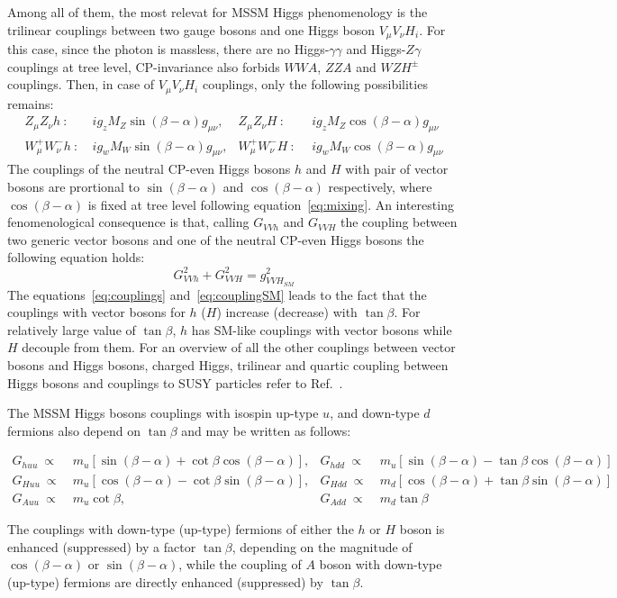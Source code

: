 Among all of them, the most relevat for MSSM Higgs phenomenology is the trilinear couplings between two gauge bosons and one Higgs boson $V_{\mu}V_{\nu}H_i$.
For this case, since the photon is massless, there are no Higgs-$\gamma\gamma$ and Higgs-$Z\gamma$ couplings at tree level, CP-invariance also forbids $WWA$, $ZZA$
and $WZH^{\pm}$ couplings. Then, in case of $V_{\mu}V_{\nu}H_i$ couplings, only the following possibilities remains:
\begin{align} 
Z_{\mu}Z_{\nu} h ~ :  ~ & ig_z M_Z \sin(\beta -\alpha) g_{\mu\nu},  &  Z_{\mu}Z_{\nu} H ~ : ~  ~    & ig_z M_Z \cos(\beta -\alpha) g_{\mu\nu} \\
W_{\mu}^+W_{\nu}^- h ~: ~&  ig_w M_W \sin(\beta -\alpha) g_{\mu\nu},  &  W_{\mu}^+W_{\nu}^- H ~ : ~ ~ & ig_w M_W \cos(\beta -\alpha) g_{\mu\nu} \label{eq:couplings} 
\end{align}
The couplings of the neutral CP-even Higgs bosons $h$ and $H$ with pair of vector bosons are prortional to $ \sin(\beta -\alpha)$ and $\cos(\beta -\alpha)$
respectively, where $\cos(\beta -\alpha)$ is fixed at tree level following equation~\eqref{eq:mixing}. An interesting fenomenological consequence is
that, calling $G_{VVh}$ and $G_{VVH}$ the coupling between two generic vector bosons and one of the neutral CP-even Higgs bosons the following equation holds:
\begin{equation}\label{eq:couplingSM}
G^2_{VVh} +G^2_{VVH} = g^2_{VVH_{SM}}
\end{equation}
The equations~\eqref{eq:couplings} and~\eqref{eq:couplingSM} leads to the fact that the couplings with vector bosons for $h$ ($H$) 
increase (decrease) with $\tan\beta$. For relatively large value of $\tan\beta$, $h$ has SM-like couplings with vector bosons while
 $H$  decouple from them. For an overview of all the other
couplings between vector bosons and Higgs bosons, charged Higgs, trilinear and quartic coupling between Higgs bosons and couplings 
to SUSY particles refer to Ref.~\cite{Djuadi}.

The MSSM Higgs bosons couplings with isospin up-type $u$, and down-type $d$ fermions also depend on $\tan\beta$ and may be written
as follows:
\begin{small}
\begin{align*}
G_{huu} ~\propto ~ & m_u [\sin(\beta - \alpha)  + \cot\beta \cos(\beta - \alpha)], & G_{hdd} ~\propto ~ & m_u [\sin(\beta - \alpha)  - \tan\beta \cos(\beta - \alpha)]\\
G_{Huu} ~\propto ~& m_u [\cos(\beta - \alpha)  - \cot\beta \sin(\beta - \alpha)], & G_{Hdd} ~\propto~  & m_d [\cos(\beta - \alpha)  + \tan\beta \sin(\beta - \alpha)]\\
G_{Auu} ~ \propto ~ & m_u  \cot\beta, & G_{Add} ~ \propto ~ & m_d \tan\beta 
\end{align*} 
\end{small}
The couplings with down-type (up-type) fermions of either the $h$ or $H$ boson is enhanced (suppressed) by a factor $\tan\beta$, depending
on the magnitude of $\cos(\beta - \alpha)$ or $\sin(\beta - \alpha)$, while the coupling of $A$ boson with down-type (up-type) fermions are directly 
enhanced (suppressed) by $\tan\beta$.


